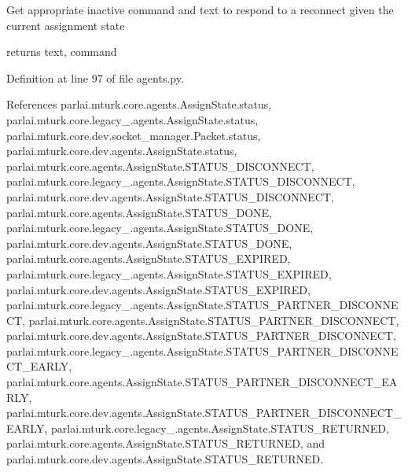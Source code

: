 \begin{DoxyVerb}Get appropriate inactive command and text to respond to a reconnect
given the current assignment state

returns text, command
\end{DoxyVerb}
 

Definition at line 97 of file agents.\+py.



References parlai.\+mturk.\+core.\+agents.\+Assign\+State.\+status, parlai.\+mturk.\+core.\+legacy\+\_.\+agents.\+Assign\+State.\+status, parlai.\+mturk.\+core.\+dev.\+socket\+\_\+manager.\+Packet.\+status, parlai.\+mturk.\+core.\+dev.\+agents.\+Assign\+State.\+status, parlai.\+mturk.\+core.\+agents.\+Assign\+State.\+S\+T\+A\+T\+U\+S\+\_\+\+D\+I\+S\+C\+O\+N\+N\+E\+CT, parlai.\+mturk.\+core.\+legacy\+\_.\+agents.\+Assign\+State.\+S\+T\+A\+T\+U\+S\+\_\+\+D\+I\+S\+C\+O\+N\+N\+E\+CT, parlai.\+mturk.\+core.\+dev.\+agents.\+Assign\+State.\+S\+T\+A\+T\+U\+S\+\_\+\+D\+I\+S\+C\+O\+N\+N\+E\+CT, parlai.\+mturk.\+core.\+agents.\+Assign\+State.\+S\+T\+A\+T\+U\+S\+\_\+\+D\+O\+NE, parlai.\+mturk.\+core.\+legacy\+\_.\+agents.\+Assign\+State.\+S\+T\+A\+T\+U\+S\+\_\+\+D\+O\+NE, parlai.\+mturk.\+core.\+dev.\+agents.\+Assign\+State.\+S\+T\+A\+T\+U\+S\+\_\+\+D\+O\+NE, parlai.\+mturk.\+core.\+agents.\+Assign\+State.\+S\+T\+A\+T\+U\+S\+\_\+\+E\+X\+P\+I\+R\+ED, parlai.\+mturk.\+core.\+legacy\+\_.\+agents.\+Assign\+State.\+S\+T\+A\+T\+U\+S\+\_\+\+E\+X\+P\+I\+R\+ED, parlai.\+mturk.\+core.\+dev.\+agents.\+Assign\+State.\+S\+T\+A\+T\+U\+S\+\_\+\+E\+X\+P\+I\+R\+ED, parlai.\+mturk.\+core.\+legacy\+\_.\+agents.\+Assign\+State.\+S\+T\+A\+T\+U\+S\+\_\+\+P\+A\+R\+T\+N\+E\+R\+\_\+\+D\+I\+S\+C\+O\+N\+N\+E\+CT, parlai.\+mturk.\+core.\+agents.\+Assign\+State.\+S\+T\+A\+T\+U\+S\+\_\+\+P\+A\+R\+T\+N\+E\+R\+\_\+\+D\+I\+S\+C\+O\+N\+N\+E\+CT, parlai.\+mturk.\+core.\+dev.\+agents.\+Assign\+State.\+S\+T\+A\+T\+U\+S\+\_\+\+P\+A\+R\+T\+N\+E\+R\+\_\+\+D\+I\+S\+C\+O\+N\+N\+E\+CT, parlai.\+mturk.\+core.\+legacy\+\_.\+agents.\+Assign\+State.\+S\+T\+A\+T\+U\+S\+\_\+\+P\+A\+R\+T\+N\+E\+R\+\_\+\+D\+I\+S\+C\+O\+N\+N\+E\+C\+T\+\_\+\+E\+A\+R\+LY, parlai.\+mturk.\+core.\+agents.\+Assign\+State.\+S\+T\+A\+T\+U\+S\+\_\+\+P\+A\+R\+T\+N\+E\+R\+\_\+\+D\+I\+S\+C\+O\+N\+N\+E\+C\+T\+\_\+\+E\+A\+R\+LY, parlai.\+mturk.\+core.\+dev.\+agents.\+Assign\+State.\+S\+T\+A\+T\+U\+S\+\_\+\+P\+A\+R\+T\+N\+E\+R\+\_\+\+D\+I\+S\+C\+O\+N\+N\+E\+C\+T\+\_\+\+E\+A\+R\+LY, parlai.\+mturk.\+core.\+legacy\+\_.\+agents.\+Assign\+State.\+S\+T\+A\+T\+U\+S\+\_\+\+R\+E\+T\+U\+R\+N\+ED, parlai.\+mturk.\+core.\+agents.\+Assign\+State.\+S\+T\+A\+T\+U\+S\+\_\+\+R\+E\+T\+U\+R\+N\+ED, and parlai.\+mturk.\+core.\+dev.\+agents.\+Assign\+State.\+S\+T\+A\+T\+U\+S\+\_\+\+R\+E\+T\+U\+R\+N\+ED.

